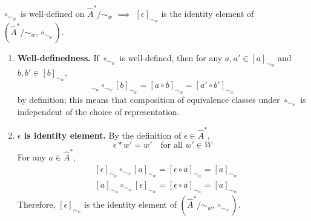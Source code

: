 \begin{propositionE}
    $\circ_{\sim_{w}}$ is well-defined on $\hat{A}^{*}/\sim_{w}$ $\implies$ $[\epsilon]_{\sim_{w}}$ is the identity element of $(\hat{A}^{*}/\sim_{w}, \circ_{\sim_{w}})$.
\end{propositionE}
\begin{proofE}
\begin{enumerate}
    \item \textbf{Well-definedness.}
    If $\circ_{\sim_{w}}$ is well-defined, then for any $a, a' \in [a]_{\sim_{w}}$ and $b, b' \in [b]_{\sim_{w}}$,
    \begin{equation}
        [a]_{\sim_{w}} \circ_{\sim_{w}} [b]_{\sim_{w}} = [a \circ b]_{\sim_{w}} = [a' \circ b']_{\sim_{w}}
    \end{equation}
    by definition; this means that composition of equivalence classes under $\circ_{\sim_{w}}$ is independent of the choice of representation.

    \item \textbf{$\epsilon$ is identity element.}
    By the definition of $\epsilon \in \hat{A}^{*}$,
    \begin{equation}
        \epsilon \ast w' = w' \quad \text{for all $w' \in W$}
    \end{equation}
    For any $a \in \hat{A}^{*}$,
    \begin{align}
        & [\epsilon]_{\sim_{w}} \circ_{\sim_{w}} [a]_{\sim_{w}} = [\epsilon \circ a]_{\sim_{w}} = [a]_{\sim_{w}} \\
        & [a]_{\sim_{w}} \circ_{\sim_{w}} [\epsilon]_{\sim_{w}} = [\epsilon \circ a]_{\sim_{w}} = [a]_{\sim_{w}}
    \end{align}
    Therefore, $[\epsilon]_{\sim_{w}}$ is the identity element of $(\hat{A}^{*}/\sim_{w}, \circ_{\sim_{w}})$.
\end{enumerate}
\end{proofE}


